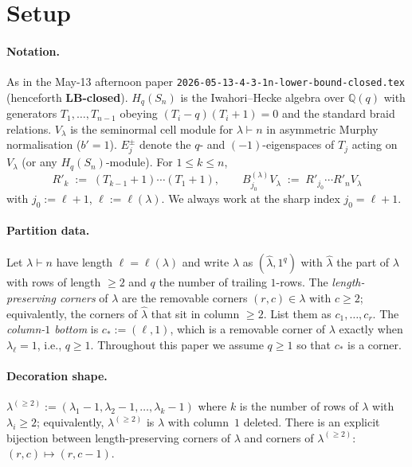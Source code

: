 \documentclass[11pt]{article}
\theoremstyle{definition}
\begin{document}
\section{Setup}\label{sec:setup}

\paragraph{Notation.} As in the May-13 afternoon paper
\texttt{2026-05-13-4-3-1n-lower-bound-closed.tex} (henceforth
\textbf{LB-closed}). $H_q(S_n)$ is the Iwahori--Hecke algebra over
$\mathbb{Q}(q)$ with generators $T_1, \ldots, T_{n-1}$ obeying
$(T_i - q)(T_i + 1) = 0$ and the standard braid relations. $V_\lambda$
is the seminormal cell module for $\lambda \vdash n$ in asymmetric
Murphy normalisation ($b' = 1$). $E_j^\pm$ denote the $q$- and
$(-1)$-eigenspaces of $T_j$ acting on $V_\lambda$ (or any
$H_q(S_n)$-module). For $1 \le k \le n$,
\[
   R'_k \;:=\; (T_{k-1}{+}1)\cdots(T_1{+}1),
   \qquad
   B^{(\lambda)}_{j_0} V_\lambda \;:=\; R'_{j_0}\cdots R'_n V_\lambda
\]
with $j_0 := \ell + 1$, $\ell := \ell(\lambda)$. We always work at
the sharp index $j_0 = \ell + 1$.

\paragraph{Partition data.} Let $\lambda \vdash n$ have length
$\ell = \ell(\lambda)$ and write $\lambda$ as $(\hat\lambda, 1^q)$
with $\hat\lambda$ the part of $\lambda$ with rows of length $\ge 2$
and $q$ the number of trailing $1$-rows. The
\emph{length-preserving corners} of $\lambda$ are the removable
corners $(r, c) \in \lambda$ with $c \ge 2$; equivalently, the
corners of $\hat\lambda$ that sit in column $\ge 2$. List them as
$c_1, \ldots, c_r$. The \emph{column-$1$ bottom} is
$c_* := (\ell, 1)$, which is a removable corner of $\lambda$ exactly
when $\lambda_\ell = 1$, i.e., $q \ge 1$. Throughout this paper we
assume $q \ge 1$ so that $c_*$ is a corner.

\paragraph{Decoration shape.}
$\lambda^{(\ge 2)} := (\lambda_1 - 1, \lambda_2 - 1, \ldots, \lambda_k - 1)$
where $k$ is the number of rows of $\lambda$ with $\lambda_i \ge 2$;
equivalently, $\lambda^{(\ge 2)}$ is $\lambda$ with column~$1$
deleted. There is an explicit bijection between length-preserving
corners of $\lambda$ and corners of $\lambda^{(\ge 2)}$:
$(r, c) \mapsto (r, c-1)$.
\end{document}
